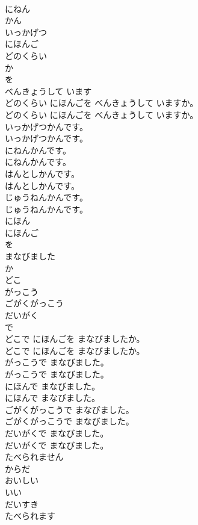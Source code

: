 \documentclass[8pt]{extreport}
\begin{document}
\begin{CJK}{UTF8}{min}
\\	にねん
\\	かん
\\	いっかげつ
\\	にほんご
\\	どのくらい
\\	か
\\	を
\\	べんきょうして います
\\	どのくらい にほんごを べんきょうして いますか。	
\\	どのくらい にほんごを べんきょうして いますか。 
\\	いっかげつかんです。	
\\	いっかげつかんです。 
\\	にねんかんです。	
\\	にねんかんです。 
\\	はんとしかんです。	
\\	はんとしかんです。 
\\	じゅうねんかんです。	
\\	じゅうねんかんです。 
\\	にほん
\\	にほんご
\\	を
\\	まなびました
\\	か
\\	どこ
\\	がっこう
\\	ごがくがっこう
\\	だいがく
\\	で
\\	どこで にほんごを まなびましたか。	
\\	どこで にほんごを まなびましたか。 
\\	がっこうで まなびました。	
\\	がっこうで まなびました。 
\\	にほんで まなびました。	
\\	にほんで まなびました。 
\\	ごがくがっこうで まなびました。	
\\	ごがくがっこうで まなびました。 
\\	だいがくで まなびました。	
\\	だいがくで まなびました。 
\\	たべられません
\\	からだ
\\	おいしい
\\	いい
\\	だいすき
\\	たべられます

\end{CJK}
\end{document}
